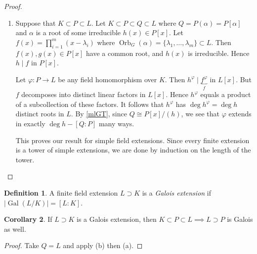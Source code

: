 \documentclass[10pt,letterpaper,cm]{nupset}
\theoremstyle{definition}
\newtheorem{definition}{Definition}[subsection]
\theoremstyle{theorem}
\newtheorem{corollary}[definition]{Corollary}
\newtheorem*{claim}{Claim}
\theoremstyle{remark}
\newcommand{\1}{\mathbf{1}}
\newcommand{\0}{\vec 0}
\DeclareMathOperator{\gal}{Gal}
\DeclareMathOperator{\orb}{Orb}
\begin{document}
\begin{proof}
\begin{enumerate}[label=(\alph*)]
We have shown that $L = \bigcup_{g\in G} L_g$.
\begin{claim}
If $K$ is an infinite field and $V$ is a finite-dimensional $K$-vector space and $V_1, V_2, \ldots, V_g \subset V$ are subspaces, then $V= \bigcup_{i=1}^g V_i \implies V = V_k$ for some $k$.
\end{claim}
\begin{proof}
Suppose that each $V_i \subsetneq V$ and that $V= \bigcup_{i=1}^g V_i $. Then there exists a linear map $f_i : V \to K$ such that $f_i \restriction_{V_i} =0$ and $f_i \ne 0$. Then $f: V \to K$ given by $f = \prod_{i=1}^kf_i$ is the function associates with a nonzero polynomial in $V= K^n$ of degree $s$.  But $f$ is the zero function since $V = \bigcup_{i=1}^k V_i$, a contradiction.
\end{proof}
\item  Suppose that $K \subset P \subset L$. Let $K \subset P \subset Q \subset L$ where $Q = P(\alpha) = P[\alpha]$ and $\alpha$ is a root of some irreducible $h(x) \in P[x]$. Let $f(x) = \prod_{i=1}^m (x-\lambda_i)$ where $\orb_G(\alpha) = \{\lambda_1, \ldots, \lambda_m\} \subset L$. Then $f(x), g(x) \in P[x]$ have a common root, and $h(x)$ is irreducible. Hence $h\mid f$ in $P[x]$.

Let $\varphi : P \to L$ be any field homomorphism over $K$.  Then $h^{\varphi}\mid \underbrace{f^{\varphi}}_{f}$ in $L[x]$. But $f$ decomposes into distinct linear factors in $L[x]$. Hence $h^{\varphi}$ equals a product of a subcollection of these factors.  It follows that $h^{\varphi}$ has $\deg{h^{\varphi}}= \deg{h}$ distinct roots in $L$. By \cref{mlGT}, since $Q \cong P[x]/(h)$, we see that $\varphi$ extends in exactly $\deg{h} - [Q:P]$ many ways. 

This proves our result for simple field extensions. Since every finite extension is a tower of simple extensions, we are done by induction on the length of the tower. 
\end{enumerate}
\end{proof}

\begin{definition}
A finite field extension $L \supset K$ is a \textit{Galois extension} if $\left\lvert{\gal(L/K)}\right\rvert = [L:K]$.
\end{definition}

\begin{corollary}\label{cor16}
If $L\supset K$ is a Galois extension, then $K \subset P \subset L \implies L\supset P$ is Galois as well.
\end{corollary}
\begin{proof}
Take $Q= L$ and apply (b) then (a).
\end{proof}
\end{document}
